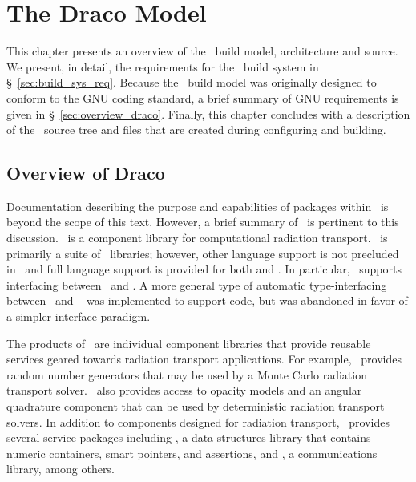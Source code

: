 
\chapter{The Draco Model}
\label{chap:model}

This chapter presents an overview of the \draco\ build model,
architecture and source.  We present, in detail, the requirements for
the \draco\ build system in \S~\ref{sec:build_sys_req}.  Because the
\draco\ build model was originally designed to conform to the GNU
coding standard, a brief summary of GNU requirements is given in
\S~\ref{sec:overview_draco}.  Finally, this chapter concludes with a
description of the \draco\ source tree and files that are created
during configuring and building.


\section{Overview of Draco}
\label{sec:overview_of_draco}

Documentation describing the purpose and capabilities of packages
within \draco\ is beyond the scope of this text.  However, a brief
summary of \draco\ is pertinent to this discussion.  \draco\ is a
component library for computational radiation transport.  \draco\ is
primarily a suite of \cpp\ libraries; however, other language support
is not precluded in \draco\ and full language support is provided for
both  and .  In particular, \draco\ supports
  interfacing
between \cpp\ and \fortran {}.  A more general type
of automatic type-interfacing between \cpp\ and \fortran~\cite{gr99}
was implemented to support  code, but was abandoned in
favor of a simpler interface paradigm.

The products of \draco\ are individual component libraries that
provide reusable services geared towards radiation transport
applications.  For example, \draco\ provides random number generators
that may be used by a Monte Carlo radiation transport solver.
\draco\ also provides access to opacity models and an angular
quadrature component that can be used by deterministic radiation
transport solvers.  In addition to components designed for radiation
transport, \draco\ provides several service packages including \dsxx,
a data structures library that contains numeric containers, smart
pointers, and assertions, and \cfour, a communications library, among
others.

